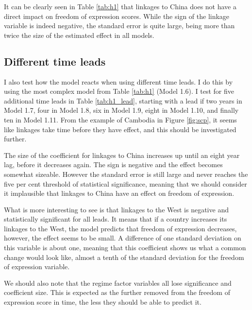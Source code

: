 It can be clearly seen in Table \ref{tab:h1} that linkages to China does not have a direct impact on freedom of expression scores. While the sign of the linkage variable is indeed negative, the standard error is quite large, being more than twice the size of the estimated effect in all models.

\subsection{Different time leads}
I also test how the model reacts when using different time leads. I do this by using the most complex model from Table \ref{tab:h1} (Model 1.6). I test for five additional time leads in Table \ref{tab:h1_lead}, starting with a lead if two years in Model 1.7, four in Model 1.8, six in Model 1.9, eight in Model 1.10, and finally ten in Model 1.11. From the example of Cambodia in Figure \ref{fig:scp}, it seems like linkages take time before they have effect, and this should be investigated further.

The size of the coefficient for linkages to China increases up until an eight year lag, before it decreases again. The sign is negative and the effect becomes somewhat sizeable. However the standard error is still large and never reaches the five per cent threshold of statistical significance, meaning that we should consider it implausible that linkages to China have an effect on freedom of expression. 

What is more interesting to see is that linkages to the West is negative and statistically significant for all leads. It means that if a country increases its linkages to the West, the model predicts that freedom of expression decreases, however, the effect seems to be small. A difference of one standard deviation on this variable is about one, meaning that this coefficient shows us what a common change would look like, almost a tenth of the standard deviation for the freedom of expression variable.

We should also note that the regime factor variables all lose significance and coefficient size. This is expected as the further removed from the freedom of expression score in time, the less they should be able to predict it. 

